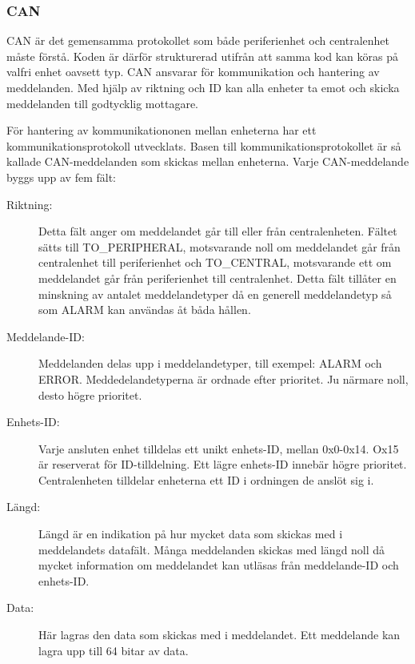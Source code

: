 \documentclass[a4paper]{article}
\begin{document}
\subsubsection{CAN}
CAN är det gemensamma protokollet som både periferienhet och centralenhet måste förstå.
Koden är därför strukturerad utifrån att samma kod kan köras på valfri enhet oavsett typ.
CAN ansvarar för kommunikation och hantering av meddelanden.
Med hjälp av riktning och ID kan alla enheter ta emot och skicka meddelanden till godtycklig mottagare.

För hantering av kommunikationonen mellan enheterna har ett kommunikationsprotokoll utvecklats. Basen till kommunikationsprotokollet är så kallade CAN-meddelanden som skickas mellan enheterna. Varje CAN-meddelande byggs upp av fem fält:
\begin{description}
    \item[Riktning:] Detta fält anger om meddelandet går till eller från centralenheten.
    Fältet sätts till TO\_PERIPHERAL, motsvarande noll om meddelandet går från centralenhet till periferienhet och TO\_CENTRAL, motsvarande ett om meddelandet går från periferienhet till centralenhet. 
    Detta fält tillåter en minskning av antalet meddelandetyper då en generell meddelandetyp så som ALARM kan användas åt båda hållen.

    \item[Meddelande-ID:] Meddelanden delas upp i meddelandetyper, till exempel: ALARM och ERROR.
    Meddedelandetyperna är ordnade efter prioritet. Ju närmare noll, desto högre prioritet.
    
    \item[Enhets-ID:] Varje ansluten enhet tilldelas ett unikt enhets-ID, mellan 0x0-0x14. Ox15 är reserverat för ID-tilldelning. Ett lägre enhets-ID innebär högre prioritet.
    Centralenheten tilldelar enheterna ett ID i ordningen de anslöt sig i.
    
    \item[Längd:] Längd är en indikation på hur mycket data som skickas med i meddelandets datafält.
    Många meddelanden skickas med längd noll då mycket information om meddelandet kan utläsas från meddelande-ID och enhets-ID.

    \item[Data:] Här lagras den data som skickas med i meddelandet. Ett meddelande kan lagra upp till 64 bitar av data.
\end{description}
\end{document}
